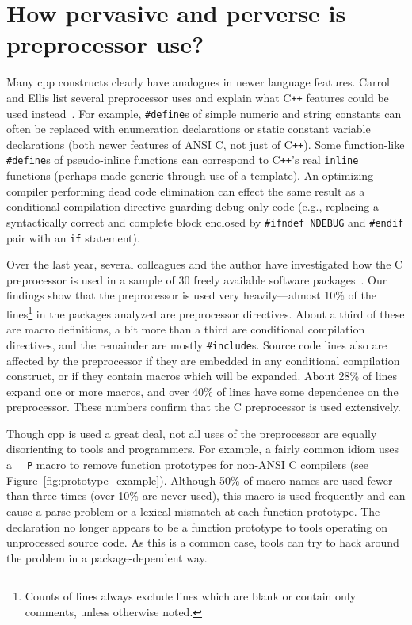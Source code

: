 \documentclass{article}
\newcommand{\Cpp}{\mbox{\textsf{cpp}}}
\newcommand{\CPP}{\mbox{\textsf{C\texttt{++}}}}
\newcommand{\C}{\mbox{\textsf{C}}}
\newcommand{\ppd}[1]{\texttt{\##1}}
\newcommand{\figref}[1]{Figure~\ref{#1}}
\begin{document}

\section{How pervasive and perverse is preprocessor use?}
\label{sec:feasibility}
Many \Cpp{} constructs clearly have analogues in newer language
features.  Carrol and Ellis list several preprocessor uses and explain
what \CPP{} features could be used instead~\cite{Carroll95}. For
example, \ppd{define}s of simple numeric and string constants can often
be replaced with enumeration declarations or static constant variable
declarations (both newer features of ANSI \C{}, not just of \CPP{}).
Some function-like \ppd{define}s of pseudo-inline functions can
correspond to \CPP{}'s real \texttt{inline} functions (perhaps made
generic through use of a template).  An optimizing compiler performing
dead code elimination can effect the same result as a
conditional compilation directive guarding debug-only code (e.g.,
replacing a syntactically correct and complete block enclosed by
\texttt{\ppd{ifndef} NDEBUG} and \ppd{endif} pair with an \texttt{if}
statement).

Over the last year, several colleagues and the author have investigated
how the \C{} preprocessor is used in a sample of 30 freely available
software packages~\cite{EmpCpp}.  Our findings show that the
preprocessor is used very heavily---almost 10\% of the
lines\footnote{Counts of lines always exclude lines which are blank or
  contain only comments, unless otherwise noted.} in the packages
analyzed are preprocessor directives.  About a third of these are macro
definitions, a bit more than a third are conditional compilation
directives, and the remainder are mostly \ppd{include}s.  Source code
lines also are affected by the preprocessor if they are embedded in any
conditional compilation construct, or if they contain macros which will
be expanded.  About 28\% of lines expand one or more macros, and over
40\% of lines have some dependence on the preprocessor.  These numbers
confirm that the \C{} preprocessor is used extensively.

Though \Cpp{} is used a great deal, not all uses of the
preprocessor are equally disorienting to tools and programmers.  For
example, a fairly common idiom uses a \texttt{\_\_P} macro to remove
function prototypes for non-ANSI \C{} compilers (see
\figref{fig:prototype_example}).  Although 50\% of macro names are
used fewer than three times (over 10\% are never used), this macro is used
frequently and can cause a parse problem or a lexical mismatch at each
function prototype.  The declaration no longer appears to be a function
prototype to tools operating on unprocessed source code.  As this is a
common case, tools can try to hack around the problem in a
package-dependent way.
\end{document}
